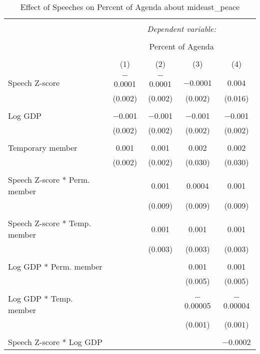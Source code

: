 
\begin{table}[!htbp] \centering 
  \caption{Effect of Speeches on Percent of Agenda about mideast_peace} 
  \label{} 
\begin{tabular}{@{\extracolsep{5pt}}lcccc} 
\\[-1.8ex]\hline 
\hline \\[-1.8ex] 
 & \multicolumn{4}{c}{\textit{Dependent variable:}} \\ 
\cline{2-5} 
\\[-1.8ex] & \multicolumn{4}{c}{Percent of Agenda} \\ 
\\[-1.8ex] & (1) & (2) & (3) & (4)\\ 
\hline \\[-1.8ex] 
 Speech Z-score & $-$0.0001 & $-$0.0001 & $-$0.0001 & 0.004 \\ 
  & (0.002) & (0.002) & (0.002) & (0.016) \\ 
  & & & & \\ 
 Log GDP & $-$0.001 & $-$0.001 & $-$0.001 & $-$0.001 \\ 
  & (0.002) & (0.002) & (0.002) & (0.002) \\ 
  & & & & \\ 
 Temporary member & 0.001 & 0.001 & 0.002 & 0.002 \\ 
  & (0.002) & (0.002) & (0.030) & (0.030) \\ 
  & & & & \\ 
 Speech Z-score * Perm. member &  & 0.001 & 0.0004 & 0.001 \\ 
  &  & (0.009) & (0.009) & (0.009) \\ 
  & & & & \\ 
 Speech Z-score * Temp. member &  & 0.001 & 0.001 & 0.001 \\ 
  &  & (0.003) & (0.003) & (0.003) \\ 
  & & & & \\ 
 Log GDP * Perm. member &  &  & 0.001 & 0.001 \\ 
  &  &  & (0.005) & (0.005) \\ 
  & & & & \\ 
 Log GDP * Temp. member &  &  & $-$0.00005 & $-$0.00004 \\ 
  &  &  & (0.001) & (0.001) \\ 
  & & & & \\ 
 Speech Z-score * Log GDP &  &  &  & $-$0.0002 \\ 

\end{tabular}
\end{table}
